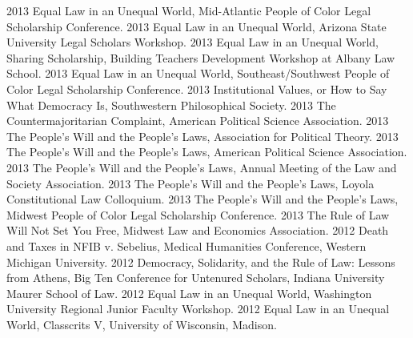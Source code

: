 \documentclass[letterpaper]{moderncv}
\begin{document}
\vspace{1mm}
\cvitem
{2013}
{Equal Law in an Unequal World, Mid-Atlantic People of Color Legal Scholarship Conference.}
\vspace{1mm}
\cvitem
{2013}
{Equal Law in an Unequal World, Arizona State University Legal Scholars Workshop.}
\vspace{1mm}
\cvitem
{2013}
{Equal Law in an Unequal World, Sharing Scholarship, Building Teachers Development Workshop at Albany Law School.}
\vspace{1mm}
\cvitem
{2013}
{Equal Law in an Unequal World, Southeast/Southwest People of Color Legal Scholarship Conference.}
\vspace{1mm}
\cvitem
{2013}
{Institutional Values, or How to Say What Democracy Is, Southwestern Philosophical Society.}
\vspace{1mm}
\cvitem
{2013}
{The Countermajoritarian Complaint, American Political Science Association.}
\vspace{1mm}
\cvitem
{2013}
{The People's Will and the People's Laws, Association for Political Theory.}
\vspace{1mm}
\cvitem
{2013}
{The People's Will and the People's Laws, American Political Science Association.}
\vspace{1mm}
\cvitem
{2013}
{The People's Will and the People's Laws, Annual Meeting of the Law and Society Association.}
\vspace{1mm}
\cvitem
{2013}
{The People's Will and the People's Laws, Loyola Constitutional Law Colloquium.}
\vspace{1mm}
\cvitem
{2013}
{The People's Will and the People's Laws, Midwest People of Color Legal Scholarship Conference.}
\vspace{1mm}
\cvitem
{2013}
{The Rule of Law Will Not Set You Free, Midwest Law and Economics Association.}
\vspace{1mm}
\cvitem
{2012}
{Death and Taxes in NFIB v. Sebelius, Medical Humanities Conference, Western Michigan University.}
\vspace{1mm}
\cvitem
{2012}
{Democracy, Solidarity, and the Rule of Law: Lessons from Athens, Big Ten Conference for Untenured Scholars, Indiana University Maurer School of Law.}
\vspace{1mm}
\cvitem
{2012}
{Equal Law in an Unequal World, Washington University Regional Junior Faculty Workshop.}
\vspace{1mm}
\cvitem
{2012}
{Equal Law in an Unequal World, Classcrits V, University of Wisconsin, Madison.}
\vspace{1mm}
\end{document}
